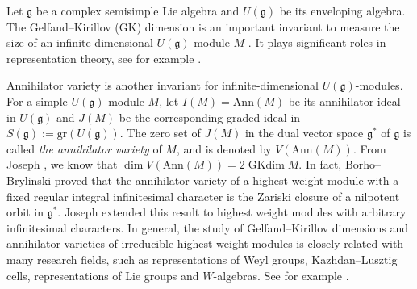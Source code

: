 \documentclass[reqno,12pt]{amsart}
\numberwithin{equation}{section}
\theoremstyle{plain}
\theoremstyle{definition}
\newcommand{\Ann}{\mathrm{Ann}}
\newcommand{\gkd}{\operatorname{GKdim}}
\begin{document}
 Let $\mathfrak{g}$ be a complex semisimple Lie algebra and $U(\mathfrak{g})$ be its enveloping algebra. The Gelfand--Kirillov (GK) dimension is an important invariant to measure the size of an infinite-dimensional $U(\mathfrak{g})$-module $M$ \cite{Ge-Ki}. 
It plays significant roles in representation theory, see for example \cite{Vo78,Jo78,J81-1}. 

Annihilator variety is another invariant for infinite-dimensional $U(\mathfrak{g})$-modules.  
 For a simple $U(\mathfrak{g})$-module $M$, let $I(M)=\Ann(M)$ be its annihilator ideal in  $U(\mathfrak{g})$ and $J(M)$ be the corresponding graded ideal in $ S(\mathfrak{g}):=\text{gr} (U(\mathfrak{g}))$. The zero set of $J(M)$ in the dual vector space $\mathfrak{g}^*$ of $\mathfrak{g}$ is called {\it the annihilator variety} of $M$, and is denoted by $V(\Ann(M))$. From Joseph \cite{Jo78}, we know that $\dim V(\Ann(M))=2\gkd M$. 
In fact, Borho--Brylinski \cite{BoB1} proved that the annihilator variety of a highest weight module  with a fixed regular integral infinitesimal
	character is the Zariski closure of a nilpotent orbit in $\mathfrak{g}^*$. Joseph \cite{Jo85} extended this result to highest weight modules with  arbitrary  infinitesimal  characters.
In general, the study of Gelfand--Kirillov dimensions and annihilator varieties of  irreducible highest weight modules  is closely related with many research fields, such as representations of Weyl groups, Kazhdan--Lusztig cells, representations of Lie groups and $W$-algebras.  See for example \cite{BarV82,BMSZ-typeC,BMSZ-ABCD,BMSZ-counting,GS,GSK,GT,Mc96,Lo15,LY}.
 
\end{document}
